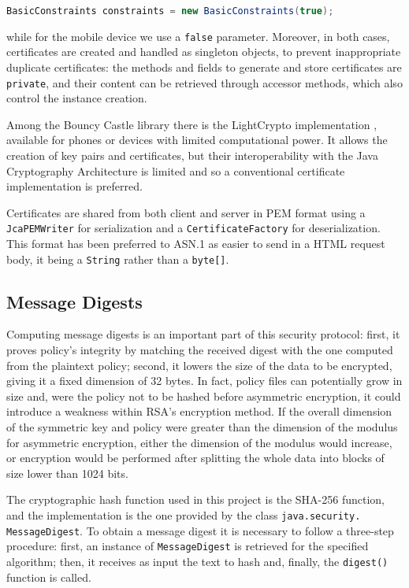 \lstinline[language=java]!BasicConstraints constraints = new BasicConstraints(true);!

\noindent while for the mobile device we use a \texttt{false} parameter. Moreover, in both cases, certificates are created and handled as singleton objects, to prevent inappropriate duplicate certificates: the methods and fields to generate and store certificates are \texttt{private}, and their content can be retrieved through accessor methods, which also control the instance creation.

Among the Bouncy Castle library there is the LightCrypto implementation \cite{LightCrypto}, available for phones or devices with limited computational power. It allows the creation of key pairs and certificates, but their interoperability with the Java Cryptography Architecture is limited and so a conventional certificate implementation is preferred. 

Certificates are shared from both client and server in PEM format using a \texttt{JcaPEMWriter} for serialization and a \texttt{CertificateFactory} for deserialization. This format has been preferred to ASN.1 as easier to send in a HTML request body, it being a \texttt{String} rather than a \texttt{byte[]}.

\subsection{Message Digests}
Computing message digests is an important part of this security protocol: first, it proves policy's integrity by matching the received digest with the one computed from the plaintext policy; second, it lowers the size of the data to be encrypted, giving it a fixed dimension of 32 bytes. In fact, policy files can potentially grow in size and, were the policy not to be hashed before asymmetric encryption, it could introduce a weakness within RSA's encryption method. If the overall dimension of the symmetric key and policy were greater than the dimension of the modulus for asymmetric encryption, either the dimension of the modulus would increase, or encryption would be performed after splitting the whole data into blocks of size lower than 1024 bits.

The cryptographic hash function used in this project is the SHA-256 function, and the implementation is the one provided by the class \texttt{java.security. MessageDigest}. To obtain a message digest it is necessary to follow a three-step procedure: first, an instance of \texttt{MessageDigest} is retrieved for the specified algorithm; then, it receives as input the text to hash and, finally, the \texttt{digest()} function is called.

